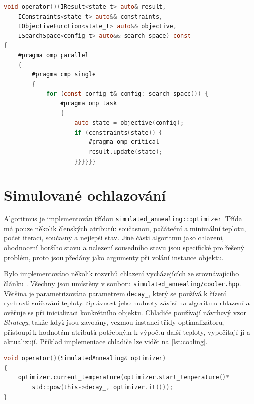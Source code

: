 \begin{lstlisting}[caption={~Optimalizace pomocí algoritmu hrubé síly},label={lst:brute-force},captionpos=t,abovecaptionskip=-\medskipamount,belowcaptionskip=\medskipamount,language=C]
void operator()(IResult<state_t> auto& result,
    IConstraints<state_t> auto&& constraints,
    IObjectiveFunction<state_t> auto&& objective,
    ISearchSpace<config_t> auto&& search_space) const
{
    #pragma omp parallel
    {
        #pragma omp single
        {
            for (const config_t& config: search_space()) {
                #pragma omp task
                {
                    auto state = objective(config);
                    if (constraints(state)) {
                        #pragma omp critical
                        result.update(state);
                    }}}}}}
\end{lstlisting}

\section{Simulované ochlazování}
Algoritmus je implementován třídou \texttt{simulated\_annealing::optimizer}.
Třída má pouze několik členských atributů: současnou, počáteční a minimální teplotu, počet iterací, současný a nejlepší stav.
Jiné části algoritmu jako chlazení, ohodnocení horšího stavu a nalezení sousedního stavu jsou specifické pro řešený problém, proto jsou předány jako argumenty při volání instance objektu.

Bylo implementováno několik rozvrhů chlazení vycházejících ze srovnávajícího článku \cite{cooling-comparison}.
Všechny jsou umístěny v souboru \texttt{simulated\_annealing/cooler.hpp}.
Většina je parametrizována parametrem \texttt{decay\_}, který se používá k řízení rychlosti snižování teploty.
Správnost jeho hodnoty závisí na algoritmu chlazení a ověřuje se při inicializaci konkrétního objektu.
Chladiče používají návrhový vzor \textit{Strategy}, takže když jsou zavolány, vezmou instanci třídy optimalizátoru, přistoupí k hodnotám atributů potřebným k výpočtu další teploty, vypočítají ji a aktualizují.
Příklad implementace chladiče lze vidět na \ref{lst:cooling}.

\begin{lstlisting}[caption={~Ukázka implementace volacího operátoru třídy \texttt{exp\_mul\_cooler}},label={lst:cooling},captionpos=t,abovecaptionskip=-\medskipamount,belowcaptionskip=\medskipamount,language=C]
void operator()(SimulatedAnnealing& optimizer)
{
    optimizer.current_temperature(optimizer.start_temperature()*
        std::pow(this->decay_, optimizer.it()));
}
\end{lstlisting}

